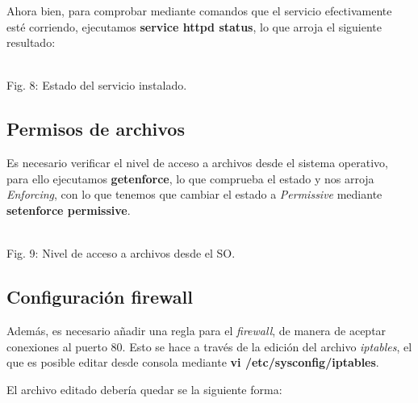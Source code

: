 \documentclass[11pt]{article}
\begin{document}
Ahora bien, para comprobar mediante comandos que el servicio efectivamente esté corriendo, ejecutamos \textbf{service httpd status}, lo que arroja el siguiente resultado:\\

\begin{minipage}[t]{\linewidth}
    \raggedright
\medskip
     \\Fig. 8: Estado del servicio instalado.\\
\end{minipage}
\newpage
\subsection{Permisos de archivos}
Es necesario verificar el nivel de acceso a archivos desde el sistema operativo, para ello ejecutamos \textbf{getenforce}, lo que comprueba el estado y nos arroja \textit{Enforcing}, con lo que tenemos que cambiar el estado a \textit{Permissive} mediante \textbf{setenforce permissive}.\\

\begin{minipage}[t]{\linewidth}
    \raggedright
\medskip
     \\Fig. 9: Nivel de acceso a archivos desde el SO.\\
\end{minipage}

\subsection{Configuración firewall}
Además, es necesario añadir una regla para el \textit{firewall}, de manera de aceptar conexiones al puerto 80. Esto se hace a través de la edición del archivo \textit{iptables}, el que es posible editar desde consola mediante \textbf{vi /etc/sysconfig/iptables}.\par
El archivo editado debería quedar se la siguiente forma:\\
\end{document}

